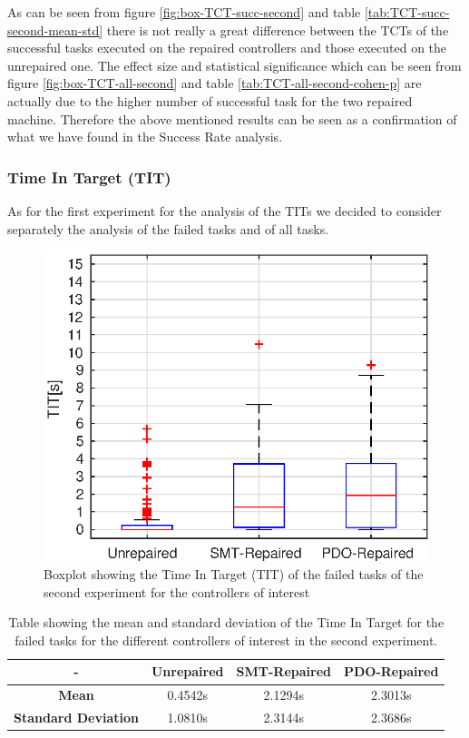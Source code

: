 As can be seen from figure \ref{fig:box-TCT-succ-second} and table \ref{tab:TCT-succ-second-mean-std} there is not really a great difference between the TCTs of the successful tasks executed on the repaired controllers and those executed on the unrepaired one. The effect size and statistical significance which can be seen from figure \ref{fig:box-TCT-all-second} and table \ref{tab:TCT-all-second-cohen-p} are actually due to the higher number of successful task for the two repaired machine. Therefore the above mentioned results can be seen as a confirmation of what we have found in the Success Rate analysis.
%
%
%
%
%
\subsubsection{Time In Target (TIT)}\label{subsub:second-TIT}
As for the first experiment for the analysis of the TITs we decided to consider separately the analysis of the failed tasks and of all tasks.
\begin{figure}[H]
    \centering
    \includegraphics[width=\textwidth]{Images/second-experiment/exp1_TIT_fail.eps}
    \caption{Boxplot showing the Time In Target (TIT) of the failed tasks of the second experiment for the controllers of interest}
    \label{fig:box-TIT-fail-second}
\end{figure}
\begin{table}[H]
    \centering
    \begin{tabular}{|c|c|c|c|}
        \hline
        - & \textbf{Unrepaired} & \textbf{SMT-Repaired} & \textbf{PDO-Repaired} \\
        \hline
        \textbf{Mean} & 0.4542s & 2.1294s & 2.3013s \\
        \textbf{Standard Deviation} & 1.0810s & 2.3144s & 2.3686s \\
        \hline
    \end{tabular}
    \caption{Table showing the mean and standard deviation of the Time In Target for the failed tasks for the different controllers of interest in the second experiment.}
    \label{tab:TIT-fail-second-mean-std}
\end{table}
